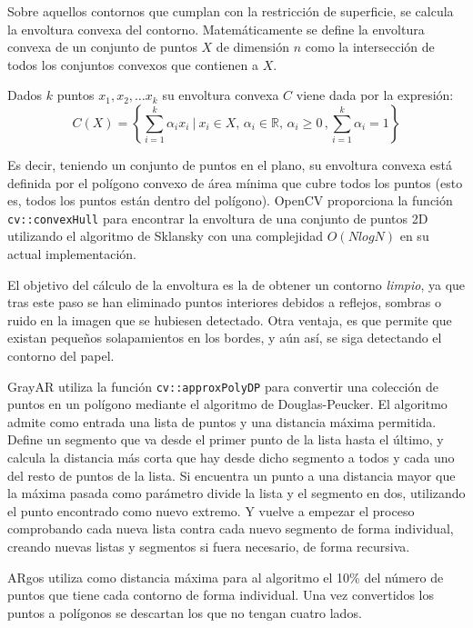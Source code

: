 Sobre aquellos contornos que cumplan con la restricción de superficie, se calcula la envoltura
convexa del contorno. Matemáticamente se define la envoltura convexa de un conjunto de puntos $X$ de
dimensión $n$ como la intersección de todos los conjuntos convexos que contienen a $X$.

Dados $k$ puntos $x_1, x_2,\dots x_k$ su envoltura convexa $C$ viene dada por la expresión:
\begin{equation}
C(X) =\left\{\sum_{i=1}^k \alpha_i x_i \ \Bigg | \ x_i\in X, \, \alpha_i\in \mathbb{R}, \, \alpha_i \geq 0 \, , \sum_{i=1}^k \alpha_i=1\right\}
\end{equation}

Es decir, teniendo un conjunto de puntos en el plano, su envoltura convexa está definida por el
polígono convexo de área mínima que cubre todos los puntos (esto es, todos los puntos están dentro
del polígono). OpenCV proporciona la función \texttt{cv::convexHull} para encontrar la envoltura de
una conjunto de puntos 2D utilizando el algoritmo de Sklansky con una complejidad $O(N log N)$ en su
actual implementación.

El objetivo del cálculo de la envoltura es la de obtener un contorno \emph{limpio}, ya que tras este
paso se han eliminado puntos interiores debidos a reflejos, sombras o ruido en la imagen que se hubiesen
detectado. Otra ventaja, es que permite que existan pequeños solapamientos en los bordes, y aún así, se
siga detectando el contorno del papel.

GrayAR utiliza la función \texttt{cv::approxPolyDP}  para convertir una colección de puntos en un
polígono mediante el algoritmo de Douglas-Peucker. El algoritmo admite como entrada una lista de
puntos y una distancia máxima permitida. Define un segmento que va desde el primer punto de la lista
hasta el último, y calcula la distancia más corta que hay desde dicho segmento a todos y cada uno
del resto de puntos de la lista. Si encuentra un punto a una distancia mayor que la máxima pasada
como parámetro divide la lista y el segmento en dos, utilizando el punto encontrado como nuevo
extremo. Y vuelve a empezar el proceso comprobando cada nueva lista contra cada nuevo segmento de
forma individual, creando nuevas listas y segmentos si fuera necesario, de forma recursiva.

ARgos utiliza como distancia máxima para al algoritmo el 10\% del número de puntos que tiene cada
contorno de forma individual. Una vez convertidos los puntos a polígonos se descartan los que no
tengan cuatro lados.

